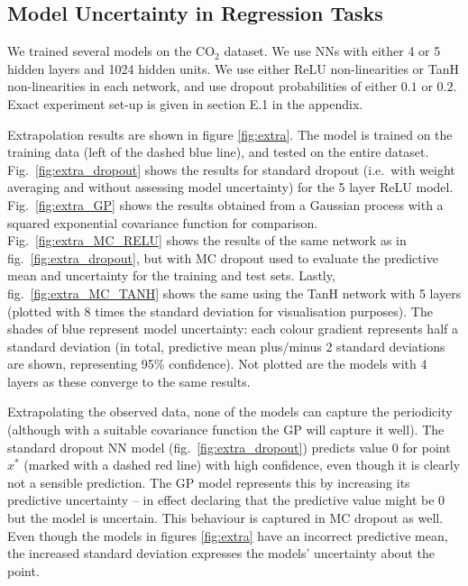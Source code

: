 \documentclass{article}
\theoremstyle{definition}
\begin{document}


\subsection{Model Uncertainty in Regression Tasks}

We trained several models on the CO$_2$ dataset. We use NNs with either 4 or 5 hidden layers and 1024 hidden units. We use either ReLU non-linearities or TanH non-linearities in each network, and use dropout probabilities of either $0.1$ or $0.2$. Exact experiment set-up is given in section E.1 in the appendix.

Extrapolation results are shown in figure \ref{fig:extra}. The model is trained on the training data (left of the dashed blue line), and tested on the entire dataset. Fig.\ \ref{fig:extra_dropout} shows the results for standard dropout (i.e.\ with weight averaging and without assessing model uncertainty) for the 5 layer ReLU model. Fig.\ \ref{fig:extra_GP} shows the results obtained from a Gaussian process with a squared exponential covariance function for comparison. Fig.\ \ref{fig:extra_MC_RELU} shows the results of the same network as in fig.\ \ref{fig:extra_dropout}, but with MC dropout used to evaluate the predictive mean and uncertainty for the training and test sets. Lastly, fig.\ \ref{fig:extra_MC_TANH} shows the same using the TanH network with 5 layers (plotted with 8 times the standard deviation for visualisation purposes). The shades of blue represent model uncertainty: each colour gradient represents half a standard deviation (in total, predictive mean plus/minus 2 standard deviations are shown, representing 95\% confidence). Not plotted are the models with 4 layers as these converge to the same results. 

Extrapolating the observed data, none of the models can capture the periodicity (although with a suitable covariance function the GP will capture it well). The standard dropout NN model (fig.\ \ref{fig:extra_dropout}) predicts value 0 for point $x^*$ (marked with a dashed red line) with high confidence, even though it is clearly not a sensible prediction. The GP model represents this by increasing its predictive uncertainty -- in effect declaring that the predictive value might be 0 but the model is uncertain. This behaviour is captured in MC dropout as well. Even though the models in figures \ref{fig:extra} have an incorrect predictive mean, the increased standard deviation expresses the models' uncertainty about the point. 
\end{document}
